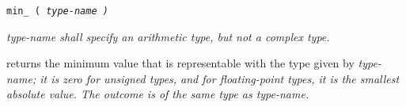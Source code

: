 
\tt{min_ (} \it{type-name} \tt{)}


\it{type-name} shall specify an arithmetic type, but not a complex type.


 returns the minimum value that is representable with
the type given by \it{type-name}; it is zero for unsigned types,
and for floating-point types, it is the smallest absolute value.
The outcome is of the same type as \it{type-name}.
